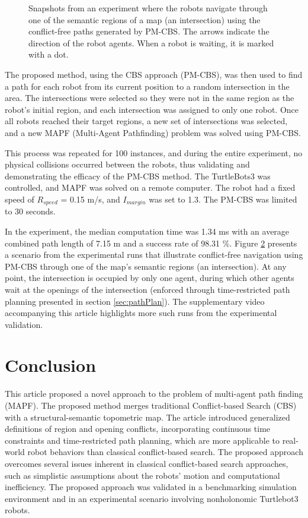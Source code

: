 \documentclass[letterpaper, 10 pt, conference]{ieeeconf}  %
\begin{document}
\begin{figure}[t]
\begin{subfigure}[b]{.25\linewidth}
         \caption{}
         \label{fig:expS6}
     \end{subfigure}
    \caption{Snapshots from an experiment where the robots navigate through one of the semantic regions of a map (an intersection) using the conflict-free paths generated by PM-CBS. The arrows indicate the direction of the robot agents. When a robot is waiting, it is marked with a dot.} 
    \label{fig:expS}
\end{figure}
The proposed method, using the CBS approach (PM-CBS), was then used to find a path for each robot from its current position to a random intersection in the area. The intersections were selected so they were not in the same region as the robot's initial region, and each intersection was assigned to only one robot. Once all robots reached their target regions, a new set of intersections was selected, and a new MAPF (Multi-Agent Pathfinding) problem was solved using PM-CBS. 

This process was repeated for 100 instances, and during the entire experiment, no physical collisions occurred between the robots, thus validating and demonstrating the efficacy of the PM-CBS method. The TurtleBots3 was controlled, and MAPF was solved on a remote computer. The robot had a fixed speed of $R_{speed}$ = 0.15 m/s, and $I_{margin}$ was set to 1.3. The PM-CBS was limited to 30 seconds.

In the experiment, the median computation time was 1.34 ms with an average combined path length of 7.15 m and a success rate of 98.31 \%.
Figure \ref{fig:expS} presents a scenario from the experimental runs that illustrate conflict-free navigation using PM-CBS through one of the map's semantic regions (an intersection). At any point, the intersection is occupied by only one agent, during which other agents wait at the openings of the intersection (enforced through time-restricted path planning presented in section \ref{sec:pathPlan}). The supplementary video accompanying this article highlights more such runs from the experimental validation.

\section{Conclusion}
This article proposed a novel approach to the problem of multi-agent path finding (MAPF). The proposed method merges traditional Conflict-based Search (CBS) with a structural-semantic topometric map. The article introduced generalized definitions of region and opening conflicts, incorporating continuous time constraints and time-restricted path planning, which are more applicable to real-world robot behaviors than classical conflict-based search. The proposed approach overcomes several issues inherent in classical conflict-based search approaches, such as simplistic assumptions about the robots' motion and computational inefficiency. The proposed approach was validated in a benchmarking simulation environment and in an experimental scenario involving nonholonomic Turtlebot3 robots.
\end{document}

